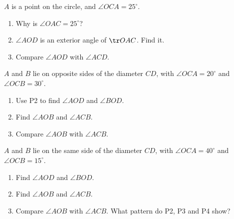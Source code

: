 \begin{solvefirst}
  \item $A$ is a point on the circle, and $\angle OCA=25^\circ$.
  \begin{enumerate}[label=(\alph*),itemsep=1pt]
    \item Why is $\angle OAC=25^\circ$?
    \item $\angle AOD$ is an exterior angle of $\tr OAC$. Find it.
    \item Compare $\angle AOD$ with $\angle ACD$.
  \end{enumerate}
  \item $A$ and $B$ lie on opposite sides of the diameter $CD$, with $\angle OCA=20^\circ$ and $\angle OCB=30^\circ$.
  \begin{enumerate}[label=(\alph*),itemsep=1pt]
    \item Use P2 to find $\angle AOD$ and $\angle BOD$.
    \item Find $\angle AOB$ and $\angle ACB$.
    \item Compare $\angle AOB$ with $\angle ACB$.
  \end{enumerate}
  \item $A$ and $B$ lie on the same side of the diameter $CD$, with $\angle OCA=40^\circ$ and $\angle OCB=15^\circ$.
  \begin{enumerate}[label=(\alph*),itemsep=1pt]
    \item Find $\angle AOD$ and $\angle BOD$.
    \item Find $\angle AOB$ and $\angle ACB$.
    \item Compare $\angle AOB$ with $\angle ACB$. What pattern do P2, P3 and P4 show?
  \end{enumerate}
\end{solvefirst}

